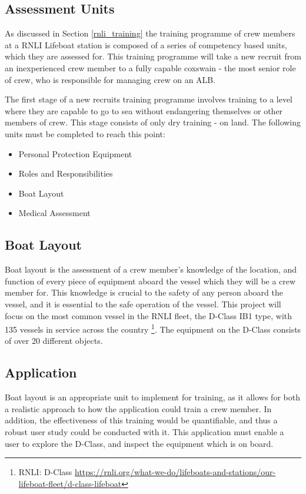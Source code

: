 \documentclass[ %
                    author={Elis Jones},
                supervisor={Dr. Kirsten Cater},
                    degree={BSc},
                     title={The Effect of Presentation Medium on Spatial Cognition},
                  subtitle={in the Virtual Environment},
                      year={2018} ]{dissertation}
\begin{document}
\subsection{Assessment Units}
As discussed in Section \ref{rnli_training} the training programme of crew members at a RNLI Lifeboat station is composed of a series of competency based units, which they are assessed for. This training programme will take a new recruit from an inexperienced crew member to a fully capable coxswain - the most senior role of crew, who is responsible for managing crew on an ALB. 

The first stage of a new recruits training programme involves training to a level where they are capable to go to sea without endangering themselves or other members of crew. This stage consists of only dry training - on land. The following units must be completed to reach this point:

\begin{itemize}
    \item Personal Protection Equipment
    \item Roles and Responsibilities
    \item Boat Layout
    \item Medical Assessment
\end{itemize}

\subsection{Boat Layout}
Boat layout is the assessment of a crew member's knowledge of the location, and function of every piece of equipment aboard the vessel which they will be a crew member for. This knowledge is crucial to the safety of any person aboard the vessel, and it is essential to the safe operation of the vessel. This project will focus on the most common vessel in the RNLI fleet, the D-Class IB1 type, with 135 vessels in service across the country \footnote{RNLI: D-Class \url{https://rnli.org/what-we-do/lifeboats-and-stations/our-lifeboat-fleet/d-class-lifeboat}}. The equipment on the D-Class consists of over 20 different objects. 

\subsection{Application}\label{application-approach}
Boat layout is an appropriate unit to implement for training, as it allows for both a realistic approach to how the application could train a crew member. In addition, the effectiveness of this training would be  quantifiable, and thus a robust user study could be conducted with it. This application must enable a user to explore the D-Class, and inspect the equipment which is on board.
\end{document}
